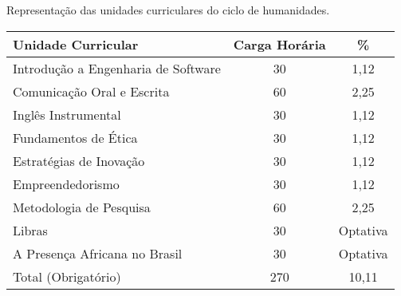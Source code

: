 \begin{quadro}[ht!]
\caption{Representação das unidades curriculares do ciclo de humanidades.}
\label{quad:humanities}
\centering
\begin{tabular}{|l|c|c|}
\hline
\rowcolor{blue1}
 Unidade Curricular &    Carga Horária  & \%\\
\hline
Introdução a Engenharia de Software & 30 & 1,12 \\
Comunicação Oral e Escrita & 60 & 2,25 \\
Inglês Instrumental & 30 & 1,12 \\
Fundamentos de Ética & 30 & 1,12 \\
Estratégias de Inovação & 30 & 1,12 \\
Empreendedorismo & 30 & 1,12 \\
Metodologia de Pesquisa & 60 & 2,25 \\
\hline
Libras & 30 & Optativa \\
A Presença Africana no Brasil & 30 & Optativa \\
\hline
Total (Obrigatório) & 270 & 10,11\\
\hline
\end{tabular}
\end{quadro}